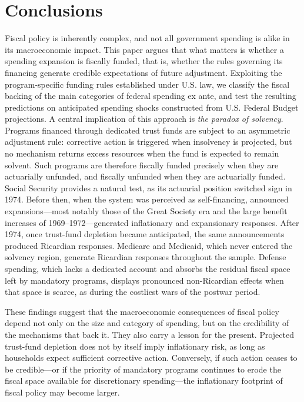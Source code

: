 \documentclass[12pt]{article}%
\theoremstyle{remark}
\begin{document}
\section{Conclusions}\label{sec: concl}
Fiscal policy is inherently complex, and not all government spending is alike in its macroeconomic impact. This paper argues that what matters is whether a spending expansion is fiscally funded, that is, whether the rules governing its financing generate credible expectations of future adjustment. Exploiting the program-specific funding rules established under U.S. law, we classify the fiscal backing of the main categories of federal spending ex ante, and test the resulting predictions on anticipated spending shocks constructed from U.S. Federal Budget projections.
A central implication of this approach is \textit{the paradox of solvency}. Programs financed through dedicated trust funds are subject to an asymmetric adjustment rule: corrective action is triggered when insolvency is projected, but no mechanism returns excess resources when the fund is expected to remain solvent. Such programs are therefore fiscally funded precisely when they are actuarially unfunded, and fiscally unfunded when they are actuarially funded. Social Security provides a natural test, as its actuarial position switched sign in 1974. Before then, when the system was perceived as self-financing, announced expansions—most notably those of the Great Society era and the large benefit increases of 1969–1972—generated inflationary and expansionary responses. After 1974, once trust-fund depletion became anticipated, the same announcements produced Ricardian responses. Medicare and Medicaid, which never entered the solvency region, generate Ricardian responses throughout the sample. Defense spending, which lacks a dedicated account and absorbs the residual fiscal space left by mandatory programs, displays pronounced non-Ricardian effects when that space is scarce, as during the costliest wars of the postwar period.

These findings suggest that the macroeconomic consequences of fiscal policy depend not only on the size and category of spending, but on the credibility of the mechanisms that back it. They also carry a lesson for the present. Projected trust-fund depletion does not by itself imply inflationary risk, as long as households expect sufficient corrective action. Conversely, if such action ceases to be credible—or if the priority of mandatory programs continues to erode the fiscal space available for discretionary spending—the inflationary footprint of fiscal policy may become larger.
\end{document}
